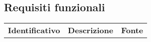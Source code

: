 \subsection{Requisiti funzionali}
\renewcommand{\arraystretch}{1.5}
\begin{longtable}{ c C{9cm} c }
    \rowcolor{\primaryColor}
    \textcolor{\secondaryColor}{
    \textbf{Identificativo}} & \textcolor{\secondaryColor}{\textbf{Descrizione}}                                                            & \textcolor{\secondaryColor}
    {\textbf{Fonte}}                                                                                                                                                      \\



\end{longtable}

